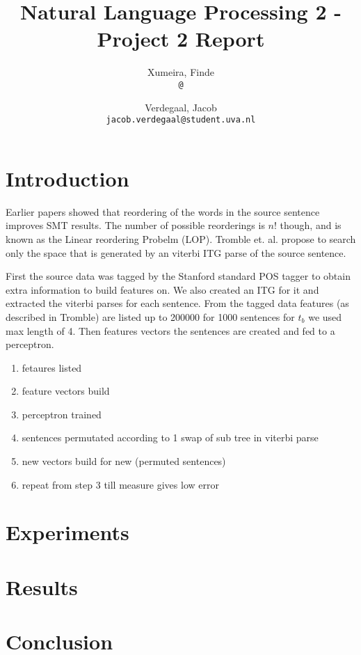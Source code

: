 \documentclass[11pt,twocolumn,DIV=11]{scrartcl}
\title{\small Natural Language Processing 2 - Project 2 Report \LARGE \\ \sc{\bf{Source Sentence Reordering for Better Translation}} }
\author{
    Xumeira, Finde\\
    \texttt{@}
    \and
    Verdegaal, Jacob\\
    \texttt{jacob.verdegaal@student.uva.nl}
}
\begin{document}
\maketitle


\section{Introduction}

Earlier papers showed that reordering of the words in the source sentence improves SMT results. The number of possible reorderings is $n!$ though, and is known as the Linear reordering Probelm (LOP). Tromble et. al. propose to search only the space that is generated by an viterbi ITG parse of the source sentence.

First the source data was tagged by the Stanford standard POS tagger to obtain extra information to build features on.
We also created an ITG for it and extracted the viterbi parses for each sentence.
From the tagged data features (as described in Tromble) are listed up to 200000 for 1000 sentences for $t_b$ we used max length of 4.
Then features vectors the sentences are created and fed to a perceptron.

\begin{enumerate}
  \item fetaures listed
  \item feature vectors build
  \item perceptron trained
  \item sentences permutated according to 1 swap of sub tree in viterbi parse
  \item new vectors build for new (permuted sentences)
  \item repeat from step 3 till measure gives low error
\end {enumerate}



\section{Experiments}
\label{experiments}

\section{Results}
\label{results}

\section{Conclusion}
\label{conclusion}



\end{document}
